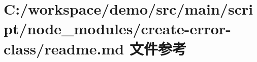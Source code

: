 \hypertarget{node__modules_2create-error-class_2_r_e_a_d_m_e_8md}{}\section{C\+:/workspace/demo/src/main/script/node\+\_\+modules/create-\/error-\/class/readme.md 文件参考}
\label{node__modules_2create-error-class_2_r_e_a_d_m_e_8md}
